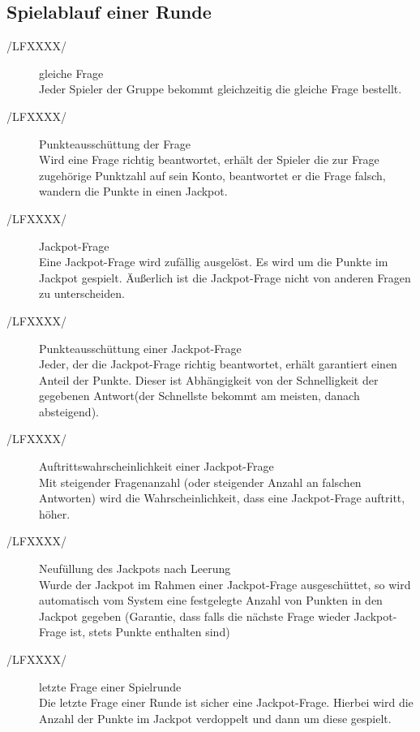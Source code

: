 \documentclass[11pt,a4paper]{scrreprt}
\begin{document}
\subsection{Spielablauf einer Runde}
\begin{description}
\item[/LFXXXX/]gleiche Frage \\
 Jeder Spieler der Gruppe bekommt gleichzeitig die gleiche Frage bestellt.
\item[/LFXXXX/]Punkteausschüttung der Frage \\
Wird eine Frage richtig beantwortet, erhält der Spieler die zur Frage zugehörige Punktzahl auf sein Konto,  beantwortet er die Frage falsch, wandern die Punkte in einen Jackpot.
\item[/LFXXXX/]Jackpot-Frage \\
Eine Jackpot-Frage wird zufällig ausgelöst. Es wird um die Punkte im Jackpot gespielt. Äußerlich ist die Jackpot-Frage nicht von anderen Fragen zu unterscheiden.
\item[/LFXXXX/] Punkteausschüttung einer Jackpot-Frage \\
Jeder, der die Jackpot-Frage richtig beantwortet, erhält garantiert einen Anteil der Punkte. Dieser ist Abhängigkeit von der Schnelligkeit der gegebenen Antwort(der Schnellste bekommt am meisten, danach absteigend).
\item[/LFXXXX/] Auftrittswahrscheinlichkeit einer Jackpot-Frage \\
 Mit steigender Fragenanzahl (oder steigender Anzahl an falschen Antworten) wird die Wahrscheinlichkeit, dass eine Jackpot-Frage auftritt, höher.
\item[/LFXXXX/] Neufüllung des Jackpots nach Leerung \\
Wurde der Jackpot im Rahmen einer Jackpot-Frage ausgeschüttet, so wird automatisch vom System eine festgelegte Anzahl von Punkten in den Jackpot gegeben (Garantie, dass falls die nächste Frage wieder Jackpot-Frage ist, stets Punkte enthalten sind)
\item[/LFXXXX/]letzte Frage einer Spielrunde \\
Die letzte Frage einer Runde ist sicher eine Jackpot-Frage. Hierbei wird die Anzahl der Punkte im Jackpot verdoppelt und dann um diese gespielt.
\end{description}
\end{document}

